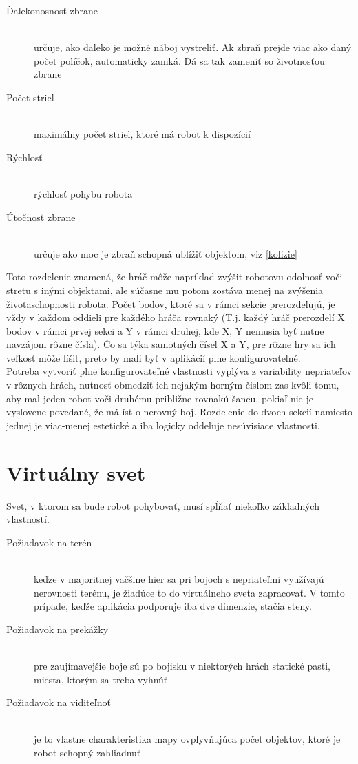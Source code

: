 \begin{description}
\begin{description}
\item [Ďalekonosnosť zbrane]\hfill \\ určuje, ako daleko je možné náboj vystreliť. Ak zbraň prejde viac ako daný počet políčok, automaticky zaniká. Dá sa tak zameniť so životnosťou zbrane
\item [Počet striel]\hfill \\ maximálny počet striel, ktoré má robot k dispozícií
\item [Rýchlosť]\hfill \\ rýchlosť pohybu robota
\item [Útočnosť zbrane]\hfill \\ určuje ako moc je zbraň schopná ublížiť objektom, viz \ref{kolizie}
\end{description}
\end{description}
Toto rozdelenie znamená, že hráč môže napríklad zvýšit robotovu odolnosť voči stretu s inými objektami, ale súčasne mu potom zostáva menej na zvýšenia životaschopnosti robota. Počet bodov, ktoré sa v rámci sekcie prerozdeľujú, je vždy v každom oddieli pre každého hráča rovnaký (T.j. každý hráč prerozdelí X bodov v rámci prvej sekci a  Y v rámci druhej, kde X, Y nemusia byť nutne navzájom rôzne čísla). Čo sa týka samotných čísel X a Y, pre rôzne hry sa ich veľkosť môže líšit, preto by mali byť v aplikácií plne konfigurovateľné.\\
Potreba vytvoriť plne konfigurovateľné vlastnosti vyplýva z variability nepriateľov v rôznych hrách, nutnosť obmedziť ich nejakým horným čislom zas kvôli tomu, aby mal jeden robot voči druhému približne rovnakú šancu, pokiaľ nie je vyslovene povedané, že má ísť o nerovný boj. Rozdelenie do dvoch sekcií namiesto jednej je viac-menej estetické a iba logicky oddeľuje nesúvisiace vlastnosti.
\section { Virtuálny svet }
Svet, v ktorom sa bude robot pohybovať, musí spĺňať niekoľko základných vlastností. 
\begin {description}
\item[Požiadavok na terén] \hfill \\ keďze v majoritnej vačšine hier sa pri bojoch s nepriateľmi využívajú nerovnosti terénu, je žiadúce to do virtuálneho sveta zapracovať. V tomto prípade, keďže aplikácia podporuje iba dve dimenzie, stačia steny.
\item[Požiadavok na prekážky] \hfill \\ pre zaujímavejšie boje sú po bojisku v niektorých hrách statické pasti, miesta, ktorým sa treba vyhnúť
\item[Požiadavok na viditeľnoť]\hfill \\ je to vlastne charakteristika mapy ovplyvňujúca počet objektov, ktoré je robot schopný zahliadnuť
\end {description}
